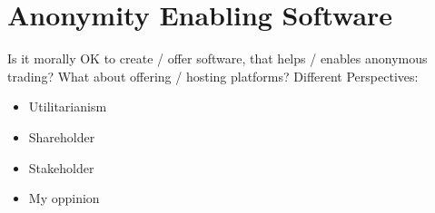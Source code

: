 \section{Anonymity Enabling Software}

Is it morally OK to create / offer software, that helps / enables anonymous trading? What about offering / hosting platforms? Different Perspectives:

\begin{itemize}
    \item Utilitarianism
    \item Shareholder
    \item Stakeholder
    \item My oppinion
\end{itemize}